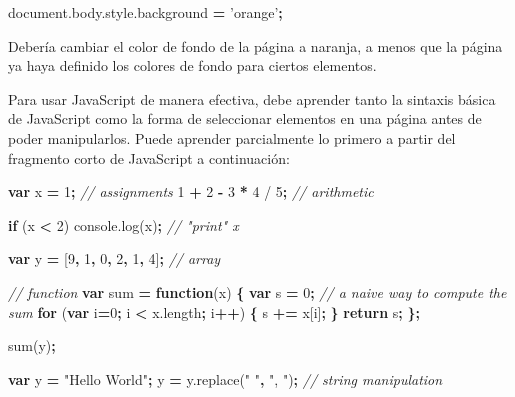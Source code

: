 \documentclass[12pt,]{krantz}
\makeatletter
\newenvironment{Shaded}{\begin{snugshade}}{\end{snugshade}}
\newcommand{\AttributeTok}[1]{\textcolor[rgb]{0.77,0.63,0.00}{#1}}
\newcommand{\CommentTok}[1]{\textcolor[rgb]{0.56,0.35,0.01}{\textit{#1}}}
\newcommand{\ControlFlowTok}[1]{\textcolor[rgb]{0.13,0.29,0.53}{\textbf{#1}}}
\newcommand{\DecValTok}[1]{\textcolor[rgb]{0.00,0.00,0.81}{#1}}
\newcommand{\KeywordTok}[1]{\textcolor[rgb]{0.13,0.29,0.53}{\textbf{#1}}}
\newcommand{\NormalTok}[1]{#1}
\newcommand{\OperatorTok}[1]{\textcolor[rgb]{0.81,0.36,0.00}{\textbf{#1}}}
\newcommand{\StringTok}[1]{\textcolor[rgb]{0.31,0.60,0.02}{#1}}
\newcommand{\VariableTok}[1]{\textcolor[rgb]{0.00,0.00,0.00}{#1}}
\newenvironment{kframe}{%
\medskip{}
\setlength{\fboxsep}{.8em}
 \def\at@end@of@kframe{}%
 \ifinner\ifhmode%
  \def\at@end@of@kframe{\end{minipage}}%
  \begin{minipage}{\columnwidth}%
 \fi\fi%
 \def\FrameCommand##1{\hskip\@totalleftmargin \hskip-\fboxsep
 \colorbox{shadecolor}{##1}\hskip-\fboxsep
     \hskip-\linewidth \hskip-\@totalleftmargin \hskip\columnwidth}%
 \MakeFramed {\advance\hsize-\width
   \@totalleftmargin\z@ \linewidth\hsize
   \@setminipage}}%
 {\par\unskip\endMakeFramed%
 \at@end@of@kframe}
\renewenvironment{Shaded}{\begin{kframe}}{\end{kframe}}
\theoremstyle{definition}
\theoremstyle{definition}
\theoremstyle{definition}
\theoremstyle{remark}
\makeatother
\begin{document}
\begin{Shaded}
\begin{Highlighting}[]
\VariableTok{document}\NormalTok{.}\VariableTok{body}\NormalTok{.}\VariableTok{style}\NormalTok{.}\AttributeTok{background} \OperatorTok{=} \StringTok{'orange'}\OperatorTok{;}
\end{Highlighting}
\end{Shaded}

Debería cambiar el color de fondo de la página a naranja, a menos que la
página ya haya definido los colores de fondo para ciertos elementos.

Para usar JavaScript de manera efectiva, debe aprender tanto la sintaxis
básica de JavaScript como la forma de seleccionar elementos en una
página antes de poder manipularlos. Puede aprender parcialmente lo
primero a partir del fragmento corto de JavaScript a continuación:

\begin{Shaded}
\begin{Highlighting}[]
\KeywordTok{var}\NormalTok{ x }\OperatorTok{=} \DecValTok{1}\OperatorTok{;}  \CommentTok{// assignments}
\DecValTok{1} \OperatorTok{+} \DecValTok{2} \OperatorTok{-} \DecValTok{3} \OperatorTok{*} \DecValTok{4}\NormalTok{ / }\DecValTok{5}\OperatorTok{;}  \CommentTok{// arithmetic}

\ControlFlowTok{if}\NormalTok{ (x }\OperatorTok{<} \DecValTok{2}\NormalTok{) }\VariableTok{console}\NormalTok{.}\AttributeTok{log}\NormalTok{(x)}\OperatorTok{;}  \CommentTok{// "print" x}

\KeywordTok{var}\NormalTok{ y }\OperatorTok{=}\NormalTok{ [}\DecValTok{9}\OperatorTok{,} \DecValTok{1}\OperatorTok{,} \DecValTok{0}\OperatorTok{,} \DecValTok{2}\OperatorTok{,} \DecValTok{1}\OperatorTok{,} \DecValTok{4}\NormalTok{]}\OperatorTok{;}  \CommentTok{// array}

\CommentTok{// function}
\KeywordTok{var}\NormalTok{ sum }\OperatorTok{=} \KeywordTok{function}\NormalTok{(x) }\OperatorTok{\{}
  \KeywordTok{var}\NormalTok{ s }\OperatorTok{=} \DecValTok{0}\OperatorTok{;}
  \CommentTok{// a naive way to compute the sum}
  \ControlFlowTok{for}\NormalTok{ (}\KeywordTok{var}\NormalTok{ i}\OperatorTok{=}\DecValTok{0}\OperatorTok{;}\NormalTok{ i }\OperatorTok{<} \VariableTok{x}\NormalTok{.}\AttributeTok{length}\OperatorTok{;}\NormalTok{ i}\OperatorTok{++}\NormalTok{) }\OperatorTok{\{}
\NormalTok{    s }\OperatorTok{+=}\NormalTok{ x[i]}\OperatorTok{;}
  \OperatorTok{\}}
  \ControlFlowTok{return}\NormalTok{ s}\OperatorTok{;}
\OperatorTok{\};}

\AttributeTok{sum}\NormalTok{(y)}\OperatorTok{;}

\KeywordTok{var}\NormalTok{ y }\OperatorTok{=} \StringTok{"Hello World"}\OperatorTok{;}
\NormalTok{y }\OperatorTok{=} \VariableTok{y}\NormalTok{.}\AttributeTok{replace}\NormalTok{(}\StringTok{" "}\OperatorTok{,} \StringTok{", "}\NormalTok{)}\OperatorTok{;}  \CommentTok{// string manipulation}
\end{Highlighting}
\end{Shaded}
\end{document}
